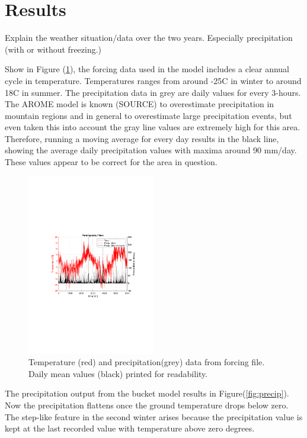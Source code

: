 \documentclass[a4paper,11pt,twocolumn]{article}
\begin{document}
\section{Results}
Explain the weather situation/data over the two years. Especially precipitation (with or without freezing.)

Show in Figure (\ref{fig:forcing}), the forcing data used in the model includes a clear annual cycle in temperature. Temperatures ranges from around -25\textdegree C in winter to around 18\textdegree C in summer. The precipitation data in grey are daily values for every 3-hours. The AROME model is known (SOURCE) to overestimate precipitation in mountain regions and in general to overestimate large precipitation events, but even taken this into account the gray line values are extremely high for this area. Therefore, running a moving average for every day results in the black line, showing the average daily precipitation values with maxima around 90 mm/day. These values appear to be correct for the area in question.   

\begin{figure}[h]
	\centering 
	\includegraphics[width=0.5\textwidth]{figures/forcing_finse}
	\caption{Temperature (red) and precipitation(grey) data from forcing file. Daily mean values (black) printed for readability.}
	\label{fig:forcing}
\end{figure}

The precipitation output from the bucket model results in Figure(\ref{fig:precip}). Now the precipitation flattens once the ground temperature drops below zero. The step-like feature in the second winter arises because the precipitation value is kept at the last recorded value with temperature above zero degrees.
\end{document}
